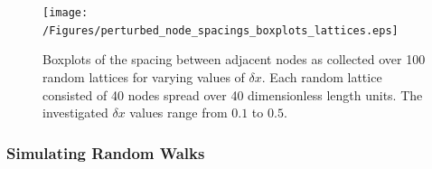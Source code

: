 \documentclass[11pt,a4paper]{article}
\begin{document}
			\begin{figure}[tbh]
				\centering
					\texttt{[image: /Figures/perturbed\_node\_spacings\_boxplots\_lattices.eps]}
				\caption{Boxplots of the spacing between adjacent nodes as collected over 100 random lattices for varying values of $\delta x$. Each random lattice consisted of 40 nodes spread over 40 dimensionless length units. The investigated $\delta x$ values range from $0.1$ to $0.5$.}
				\label{fig:perturbed_node_spacings_boxplots_lattices}
			\end{figure}


		\subsubsection{Simulating Random Walks}
		\label{sub:simulatingrandomwalks_perturbed}
			
\end{document}
